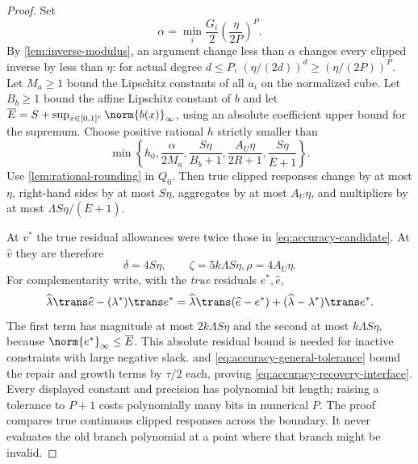 \begin{proof}
Set
\[
 \alpha=\min_i\frac{G_i}{2}\left(\frac{\eta}{2P}\right)^P.
\]
By \cref{lem:inverse-modulus}, an argument change less than $\alpha$
changes every clipped inverse by less than $\eta$: for actual degree
$d\le P$, $(\eta/(2d))^d\ge(\eta/(2P))^P$.
Let $M_a\ge1$ bound the Lipschitz constants of all $a_i$ on the
normalized cube. Let $B_b\ge1$ bound the affine Lipschitz constant of
$b$ and let $\overline E=S+\sup_{x\in[0,1]^r}\norm{b(x)}_\infty$,
using an absolute coefficient upper bound for the supremum. Choose
positive rational $h$ strictly smaller than
\begin{equation}\label{eq:accuracy-rounding-distance}
 \min\left\{h_0,\frac{\alpha}{2M_a},
 \frac{S\eta}{B_b+1},\frac{A_U\eta}{2R+1},
                                      \frac{S\eta}{\overline E+1}\right\}.
\end{equation}
Use \cref{lem:rational-rounding} in $Q_0$. Then true clipped responses
change by at most $\eta$, right-hand sides by at most $S\eta$,
aggregates by at most $A_U\eta$, and multipliers by at most
$\Lambda S\eta/(\overline E+1)$.

At $v^*$ the true residual allowances were twice those in
\eqref{eq:accuracy-candidate}. At $\widehat v$ they are therefore
\begin{equation}\label{eq:accuracy-transferred-residuals}
       \delta=4S\eta,\qquad \zeta=5k\Lambda S\eta,
                                      \rho=4A_U\eta.
\end{equation}
For complementarity write, with the \emph{true} residuals $e^*,\widehat e$,
\[
 \widehat\lambda\trans\widehat e-(\lambda^*)\trans e^*
 =\widehat\lambda\trans(\widehat e-e^*)
                         +(\widehat\lambda-\lambda^*)\trans e^*.
\]
The first term has magnitude at most $2k\Lambda S\eta$ and the
second at most $k\Lambda S\eta$, because
$\norm{e^*}_\infty\le\overline E$. This absolute residual bound
is needed for inactive constraints with large negative slack.
 and
\eqref{eq:accuracy-general-tolerance} bound the repair and growth terms
by $\tau/2$ each, proving \eqref{eq:accuracy-recovery-interface}.
Every displayed constant and precision has polynomial bit length;
raising a tolerance to $P+1$ costs polynomially many bits in numerical
$P$. The proof compares true continuous clipped responses across the
boundary. It never evaluates the old branch polynomial at a point where
that branch might be invalid.
\end{proof}

